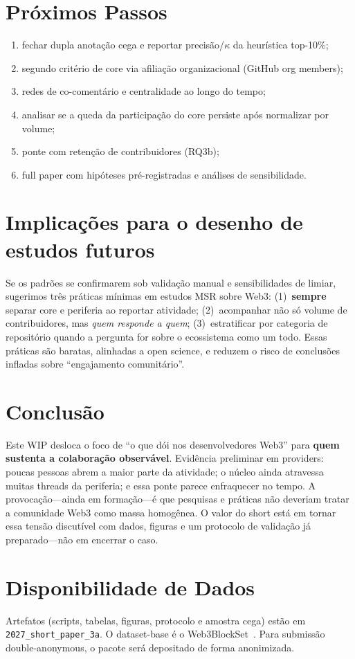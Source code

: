 \documentclass[10pt,conference]{IEEEtran}
\begin{document}
\section{Próximos Passos}
\begin{enumerate}
\item fechar dupla anotação cega e reportar precisão/$\kappa$ da heurística top-10\%;
\item segundo critério de core via afiliação organizacional (GitHub org members);
\item redes de co-comentário e centralidade ao longo do tempo;
\item analisar se a queda da participação do core persiste após normalizar por volume;
\item ponte com retenção de contribuidores (RQ3b);
\item full paper com hipóteses pré-registradas e análises de sensibilidade.
\end{enumerate}

\section{Implicações para o desenho de estudos futuros}

Se os padrões se confirmarem sob validação manual e sensibilidades de limiar, sugerimos três práticas mínimas em estudos MSR sobre Web3: (1)~\textbf{sempre} separar core e periferia ao reportar atividade; (2)~acompanhar não só volume de contribuidores, mas \emph{quem responde a quem}; (3)~estratificar por categoria de repositório quando a pergunta for sobre o ecossistema como um todo. Essas práticas são baratas, alinhadas a open science, e reduzem o risco de conclusões infladas sobre ``engajamento comunitário''.

\section{Conclusão}

Este WIP desloca o foco de ``o que dói nos desenvolvedores Web3'' para \textbf{quem sustenta a colaboração observável}. Evidência preliminar em providers: poucas pessoas abrem a maior parte da atividade; o núcleo ainda atravessa muitas threads da periferia; e essa ponte parece enfraquecer no tempo. A provocação---ainda em formação---é que pesquisas e práticas não deveriam tratar a comunidade Web3 como massa homogênea. O valor do short está em tornar essa tensão discutível com dados, figuras e um protocolo de validação já preparado---não em encerrar o caso.

\section*{Disponibilidade de Dados}
Artefatos (scripts, tabelas, figuras, protocolo e amostra cega) estão em \texttt{2027\_short\_paper\_3a}. O dataset-base é o Web3BlockSet~\cite{soares2026web3blockset}. Para submissão double-anonymous, o pacote será depositado de forma anonimizada.



\end{document}
